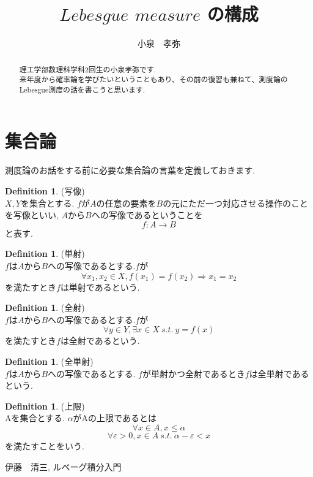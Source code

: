\documentclass[11pt, a4paper, dvipdfmx]{jsarticle}
\title{$Lebesgue$ $measure$ の構成}
\author{小泉　孝弥}
\date{}
\theoremstyle{definition}
\newtheorem{Definition+}[Axiom+]{Definition}
\newcommand{\e}{\varepsilon}
\begin{document}
\maketitle
\begin{abstract}
理工学部数理科学科2回生の小泉孝弥です.\\来年度から確率論を学びたいということもあり、その前の復習も兼ねて、測度論のLebesgue測度の話を書こうと思います.
\end{abstract}
\section{集合論}
測度論のお話をする前に必要な集合論の言葉を定義しておきます.
\begin{Definition+}(写像)\\
  $X, Y$を集合とする.
  $f$が$A$の任意の要素を$B$の元にただ一つ対応させる操作のことを写像といい, $A$から$B$への写像であるということを
  \begin{equation*}
    f : A \to B
  \end{equation*}
  と表す.
\end{Definition+}
\begin{Definition+}
  (単射)\\
  $f$は$A$から$B$への写像であるとする.$f$が\\
  \begin{equation*}
    \forall x_{1}, x_{2}\in X, f(x_{1}) = f(x_{2}) \Longrightarrow x_{1} = x_{2}
  \end{equation*}
  を満たすとき$f$は単射であるという.
\end{Definition+}
\begin{Definition+}
  (全射)\\
  $f$は$A$から$B$への写像であるとする.$f$が
  \begin{equation*}
    \forall y \in Y, \exists x\in X ~s.t.~ y = f(x)
  \end{equation*}
  を満たすとき$f$は全射であるという.
\end{Definition+}
\begin{Definition+}
  (全単射)\\
  $f$は$A$から$B$への写像であるとする.
  $f$が単射かつ全射であるとき$f$は全単射であるという.
\end{Definition+}
\begin{Definition+}(上限)\\
  Aを集合とする.
  $\alpha$がAの上限であるとは
  \begin{equation*}
    \forall x \in A, x \leq \alpha
  \end{equation*}
  \begin{equation*}
    \forall \e > 0, x\in A~s.t.~ \alpha - \e < x
  \end{equation*}
を満たすことをいう.
\end{Definition+}
\begin{thebibliography}{9}
  伊藤　清三, ルベーグ積分入門
\end{thebibliography}
\end{document}
